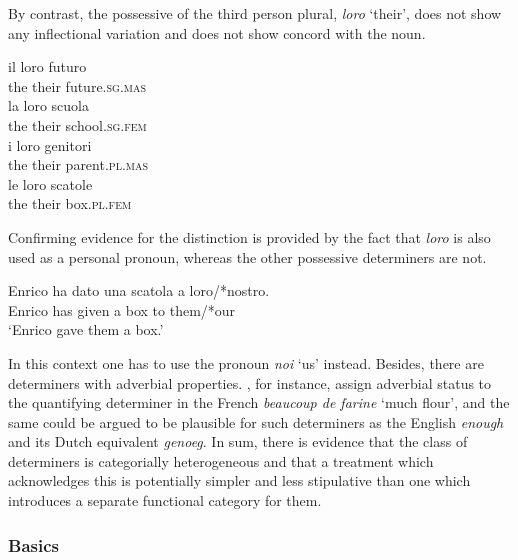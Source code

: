 \documentclass[output=paper
                ,modfonts
                ,nonflat
	        ,collection
	        ,collectionchapter
	        ,collectiontoclongg
 	        ,biblatex
                ,babelshorthands
                ,newtxmath
                ,draftmode
                ,colorlinks, citecolor=brown
]{./langsci/langscibook}
\begin{document}
\noindent
By contrast, the possessive of the third person plural, \emph{loro} `their',
does not show any inflectional variation and does not show concord with the noun.

\begin{exe} 
\ex 
\begin{xlist}
\ex 
\gll  il loro futuro \\   
      the their future.\textsc{sg.mas}  \\ 
\ex 
\gll  la loro scuola  \\   
      the their school.\textsc{sg.fem}   \\ 
\ex 
\gll  i loro genitori \\   
      the their parent.\textsc{pl.mas} \\ 
\ex 
\gll  le loro scatole \\   
      the their box.\textsc{pl.fem} \\ 
\end{xlist} 
\end{exe}

\noindent
Confirming evidence for the distinction is provided by the fact that 
\emph{loro} is also used as a personal pronoun, whereas the other 
possessive determiners are not. 

\begin{exe} 
\ex 
\gll   Enrico ha dato una scatola a loro/*nostro. \\
       Enrico has given a box to them/*our \\
\trans `Enrico gave them a box.'
\end{exe} 

\noindent
In this context one has to use the pronoun \emph{noi} `us' instead. 
Besides, there are determiners with adverbial properties. 
\citet{Abeilleetal04}, for instance, 
assign adverbial status to the quantifying determiner in the French 
\emph{beaucoup de farine} `much flour', and the same could be argued to 
be plausible for such determiners as the English \emph{enough} and its 
Dutch equivalent \emph{genoeg}. 
In sum, there is evidence that the class of determiners is categorially 
heterogeneous and that a treatment which acknowledges this is potentially 
simpler and less stipulative than one which introduces a separate functional 
category for them. 
 

\subsubsection{Basics} 
\label{sec-basics}
\end{document}
